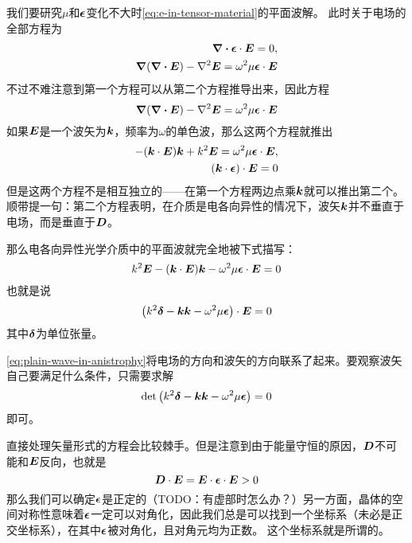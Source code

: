 我们要研究$\mu$和$\vb*{\epsilon}$变化不大时\eqref{eq:e-in-tensor-material}的平面波解。
此时关于电场的全部方程为
\[
    \begin{aligned}
        \div{\vb*{\epsilon} \cdot \vb*{E}} = 0, \\
        \grad{(\div{\vb*{E}})} - \laplacian{\vb*{E}} = \omega^2 \mu \vb*{\epsilon} \cdot \vb*{E}
    \end{aligned}
\]
不过不难注意到第一个方程可以从第二个方程推导出来，因此方程
\begin{equation}
    \grad{(\div{\vb*{E}})} - \laplacian{\vb*{E}} = \omega^2 \mu \vb*{\epsilon} \cdot \vb*{E}
    \label{eq:anisotropy}
\end{equation}
如果$\vb*{E}$是一个波矢为$\vb*{k}$，频率为$\omega$的单色波，那么这两个方程就推出
\[
    \begin{aligned}
        - (\vb*{k} \cdot \vb*{E}) \vb*{k} + k^2 \vb*{E} = \omega^2 \mu \vb*{\epsilon} \cdot \vb*{E}, \\
    (\vb*{k} \cdot \vb*{\epsilon}) \cdot \vb*{E} = 0
    \end{aligned}
\]
但是这两个方程不是相互独立的——在第一个方程两边点乘$\vb*{k}$就可以推出第二个。
顺带提一句：第二个方程表明，在介质是电各向异性的情况下，波矢$\vb*{k}$并不垂直于电场，而是垂直于$\vb*{D}$。

那么电各向异性光学介质中的平面波就完全地被下式描写：
\[
    k^2 \vb*{E} - (\vb*{k} \cdot \vb*{E}) \vb*{k} - \omega^2 \mu \vb*{\epsilon} \cdot \vb*{E} = 0
\]
也就是说
\begin{equation}
    \left( k^2 \vb*{\delta} - \vb*{k} \vb*{k} - \omega^2 \mu \vb*{\epsilon} \right) \cdot \vb*{E} = 0
    \label{eq:plain-wave-in-anistrophy}
\end{equation}
其中$\vb*{\delta}$为单位张量。

\eqref{eq:plain-wave-in-anistrophy}将电场的方向和波矢的方向联系了起来。要观察波矢自己要满足什么条件，只需要求解
\begin{equation}
    \det \left( k^2 \vb*{\delta} - \vb*{k} \vb*{k} - \omega^2 \mu \vb*{\epsilon} \right) = 0
    \label{eq:k-det}
\end{equation}
即可。

直接处理矢量形式的方程会比较棘手。但是注意到由于能量守恒的原因，$\vb*{D}$不可能和$\vb*{E}$反向，也就是
\[
    \vb*{D} \cdot \vb*{E} = \vb*{E} \cdot \vb*{\epsilon} \cdot \vb*{E} > 0
\]
那么我们可以确定$\vb*{\epsilon}$是正定的（TODO：有虚部时怎么办？）另一方面，晶体的空间对称性意味着$\vb*{\epsilon}$一定可以对角化，因此我们总是可以找到一个坐标系（未必是正交坐标系），在其中$\vb*{\epsilon}$被对角化，且对角元均为正数。
这个坐标系就是所谓的。

